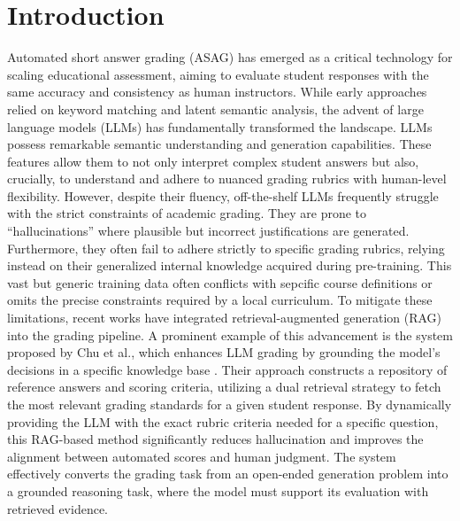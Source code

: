 \documentclass{edm_article}
\begin{document}






\section{Introduction}

Automated short answer grading (ASAG) has emerged as a critical technology for scaling educational assessment, aiming to evaluate student responses with the same accuracy and consistency as human instructors. While early approaches relied on keyword matching and latent semantic analysis, the advent of large language models (LLMs) has fundamentally transformed the landscape. LLMs possess remarkable semantic understanding and generation capabilities. These features allow them to not only interpret complex student answers but also, crucially, to understand and adhere to nuanced grading rubrics with human-level flexibility. However, despite their fluency, off-the-shelf LLMs frequently struggle with the strict constraints of academic grading. They are prone to ``hallucinations'' where plausible but incorrect justifications are generated. Furthermore, they often fail to adhere strictly to specific grading rubrics, relying instead on their generalized internal knowledge acquired during pre-training. This vast but generic training data often conflicts with sepcific course definitions or omits the precise constraints required by a local curriculum. To mitigate these limitations, recent works have integrated retrieval-augmented generation (RAG) into the grading pipeline. A prominent example of this advancement is the system proposed by Chu et al., which enhances LLM grading by grounding the model's decisions in a specific knowledge base \cite{chu2025enhancing}. Their approach constructs a repository of reference answers and scoring criteria, utilizing a dual retrieval strategy to fetch the most relevant grading standards for a given student response. By dynamically providing the LLM with the exact rubric criteria needed for a specific question, this RAG-based method significantly reduces hallucination and improves the alignment between automated scores and human judgment. The system effectively converts the grading task from an open-ended generation problem into a grounded reasoning task, where the model must support its evaluation with retrieved evidence.
\end{document}
